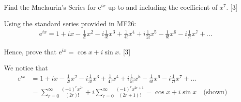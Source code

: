 \documentclass[12pt, a4 paper]{article}
\begin{document}
\begin{outline}[enumerate]
 \1 Find the Maclaurin's Series for \(\mathrm{e}^{ix}\) up to and including the coefficient of \(x^7\). \hfill[3]
 \begin{answer}
  Using the standard series provided in MF26:
  \begin{align*}
   \mathrm{e}^{ix} = 1 + ix - \frac{1}{2!}x^2 - i\frac{1}{3!}x^3 + \frac{1}{4!}x^4 + i\frac{1}{5!}x^5 - \frac{1}{6!}x^6 - i\frac{1}{7!}x^7+ \dots
  \end{align*}
 \end{answer}
Hence, prove that \(\mathrm{e}^{ix} = \cos x + i\sin x\). \hfill[3] %
 \begin{answer}
  We notice that
  \begin{align*}
   \mathrm{e}^{ix} & = 1 + ix - \frac{1}{2!}x^2 - i\frac{1}{3!}x^3 + \frac{1}{4!}x^4 + i\frac{1}{5!}x^5 - \frac{1}{6!}x^6 - i\frac{1}{7!}x^7+ \dots                             \\
                   & = \sum_{r=0}^{\infty} \frac{{(-1)}^r x^{2r}}{(2r)!} + i\sum_{r=0}^{\infty} \frac{{(-1)}^r x^{2r+1}}{(2r+1)!} = \cos x + i\sin x \quad\textrm{(shown)}\quad
  \end{align*}
 \end{answer}
\end{outline}
\end{document}
